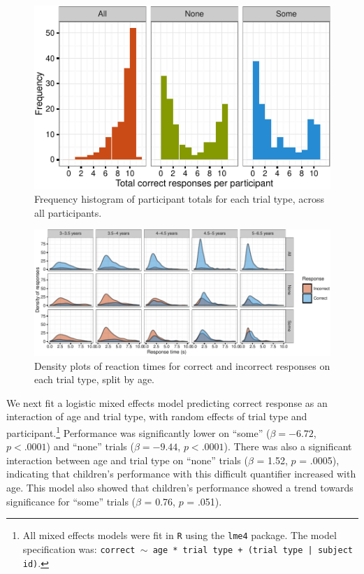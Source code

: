 \documentclass[10pt, letterpaper]{article}
\newenvironment{CodeChunk}{}{}
\begin{document}
\begin{CodeChunk}
\begin{figure}[t]
\includegraphics{figs/diptest-1} \caption[Frequency histogram of participant totals for each trial type, across all participants]{Frequency histogram of participant totals for each trial type, across all participants.}\label{fig:diptest}
\end{figure}
\end{CodeChunk}

\begin{CodeChunk}
\begin{figure}[t]

{\centering \includegraphics{figs/dense-1} 

}

\caption[Density plots of reaction times for correct and incorrect responses on each trial type, split by age]{Density plots of reaction times for correct and incorrect responses on each trial type, split by age.}\label{fig:dense}
\end{figure}
\end{CodeChunk}

We next fit a logistic mixed effects model predicting correct response
as an interaction of age and trial type, with random effects of trial
type and
participant.\footnote{All mixed effects models were fit in \texttt{R} using the \texttt{lme4} package. The model specification was: \texttt{correct $\sim$ age * trial type + (trial type | subject id)}.}
Performance was significantly lower on ``some'' (\(\beta = -6.72\),
\(p < .0001\)) and ``none'' trials (\(\beta = -9.44\), \(p < .0001\)).
There was also a significant interaction between age and trial type on
``none'' trials (\(\beta\) = 1.52, \(p\) = .0005), indicating that
children's performance with this difficult quantifier increased with
age. This model also showed that children's performance showed a trend
towards significance for ``some'' trials (\(\beta\) = 0.76, \(p\) =
.051).
\end{document}
